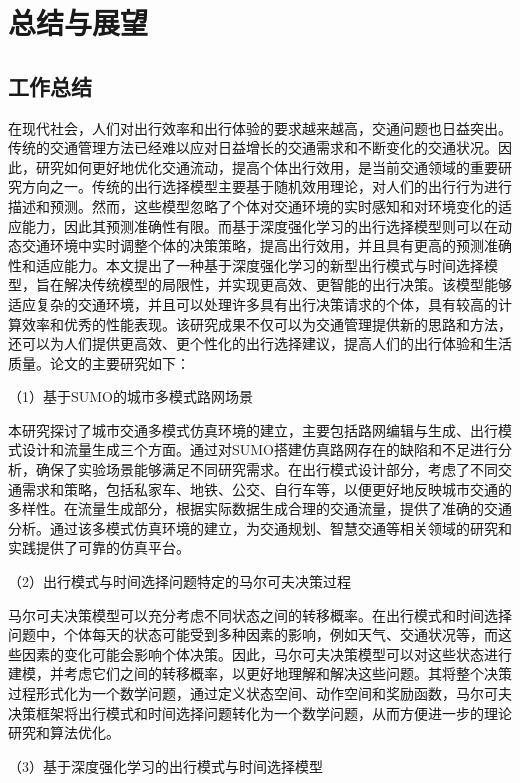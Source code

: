 \chapter{总结与展望}
\label{chp:version_license}

\section{工作总结}

在现代社会，人们对出行效率和出行体验的要求越来越高，交通问题也日益突出。传统的交通管理方法已经难以应对日益增长的交通需求和不断变化的交通状况。因此，研究如何更好地优化交通流动，提高个体出行效用，是当前交通领域的重要研究方向之一。传统的出行选择模型主要基于随机效用理论，对人们的出行行为进行描述和预测。然而，这些模型忽略了个体对交通环境的实时感知和对环境变化的适应能力，因此其预测准确性有限。而基于深度强化学习的出行选择模型则可以在动态交通环境中实时调整个体的决策策略，提高出行效用，并且具有更高的预测准确性和适应能力。本文提出了一种基于深度强化学习的新型出行模式与时间选择模型，旨在解决传统模型的局限性，并实现更高效、更智能的出行决策。该模型能够适应复杂的交通环境，并且可以处理许多具有出行决策请求的个体，具有较高的计算效率和优秀的性能表现。该研究成果不仅可以为交通管理提供新的思路和方法，还可以为人们提供更高效、更个性化的出行选择建议，提高人们的出行体验和生活质量。论文的主要研究如下：

（1）基于SUMO的城市多模式路网场景

本研究探讨了城市交通多模式仿真环境的建立，主要包括路网编辑与生成、出行模式设计和流量生成三个方面。通过对SUMO搭建仿真路网存在的缺陷和不足进行分析，确保了实验场景能够满足不同研究需求。在出行模式设计部分，考虑了不同交通需求和策略，包括私家车、地铁、公交、自行车等，以便更好地反映城市交通的多样性。在流量生成部分，根据实际数据生成合理的交通流量，提供了准确的交通分析。通过该多模式仿真环境的建立，为交通规划、智慧交通等相关领域的研究和实践提供了可靠的仿真平台。

（2）出行模式与时间选择问题特定的马尔可夫决策过程

马尔可夫决策模型可以充分考虑不同状态之间的转移概率。在出行模式和时间选择问题中，个体每天的状态可能受到多种因素的影响，例如天气、交通状况等，而这些因素的变化可能会影响个体决策。因此，马尔可夫决策模型可以对这些状态进行建模，并考虑它们之间的转移概率，以更好地理解和解决这些问题。其将整个决策过程形式化为一个数学问题，通过定义状态空间、动作空间和奖励函数，马尔可夫决策框架将出行模式和时间选择问题转化为一个数学问题，从而方便进一步的理论研究和算法优化。


（3）基于深度强化学习的出行模式与时间选择模型

